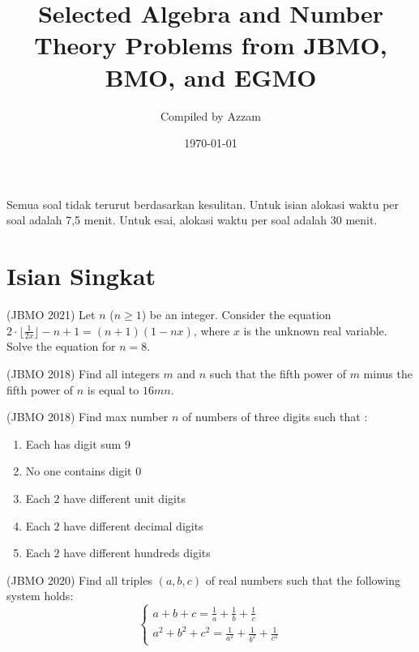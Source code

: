 \documentclass[12pt]{scrartcl}
\begin{document}
	\title{Selected Algebra and Number Theory Problems from JBMO, BMO, and EGMO} %
	\date{\today}
	\author{Compiled by Azzam}
	\maketitle

\renewcommand*\contentsname{Daftar Isi}
\tableofcontents

\newpage
	Semua soal tidak terurut berdasarkan kesulitan. Untuk isian alokasi waktu per soal adalah 7,5 menit. Untuk esai, alokasi waktu per soal adalah 30 menit.
	\section{Isian Singkat}
	\begin{soalbaru}(JBMO 2021)
	Let $n$ ($n \ge 1$) be an integer. Consider the equation $2\cdot \lfloor{\frac{1}{2x}}\rfloor - n + 1 = (n + 1)(1 - nx)$, where $x$ is the unknown real variable. Solve the equation for $n = 8$.
	\end{soalbaru}
	
	\begin{soalbaru}(JBMO 2018)
	Find all integers $m$ and $n$ such that the fifth power of $m$ minus the fifth power of $n$ is equal to $16mn$.
	\end{soalbaru}
	
	\begin{soalbaru}(JBMO 2018)
	Find max number $n$ of numbers of three digits such that :
    \begin{enumerate}\item Each has digit sum $9$
\item No one contains digit $0$
\item Each $2$ have different unit digits
\item Each $2$ have different decimal digits
\item Each $2$ have different hundreds digits
    \end{enumerate}
	\end{soalbaru}

    \begin{soalbaru}(JBMO 2020)
    Find all triples $(a,b,c)$ of real numbers such that the following system holds:
$$\begin{cases} a+b+c=\frac{1}{a}+\frac{1}{b}+\frac{1}{c} \\a^2+b^2+c^2=\frac{1}{a^2}+\frac{1}{b^2}+\frac{1}{c^2}\end{cases}$$
    \end{soalbaru}
    
\end{document}
